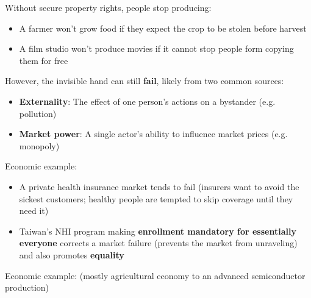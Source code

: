 \documentclass[12pt,a4paper]{article}
\begin{document}
\noindent Without secure property rights, people stop producing:
\hn\begin{itemize}
    \item A farmer won't grow food if they expect the crop to be stolen before harvest
    \item A film studio won't produce movies if it cannot stop people form copying them for free
\end{itemize}

\noindent However, the invisible hand can still \textbf{fail}, likely from two common sources:
\begin{itemize}
    \item \textbf{Externality}: The effect of one person's actions on a bystander (e.g. pollution)
    \item \textbf{Market power}: A single actor's ability to influence market prices (e.g. monopoly)
\end{itemize}

\noindent Economic example: 
\begin{itemize}
    \item A private health insurance market tends to fail (insurers want to avoid the sickest customers; healthy people are tempted to skip coverage until they need it)
    \item Taiwan's NHI program making \textbf{enrollment mandatory for essentially everyone} corrects a market failure (prevents the market from unraveling) and also promotes \textbf{equality}
\end{itemize}




\noindent Economic example:  (mostly agricultural economy to an advanced semiconductor production) \\


\end{document}
